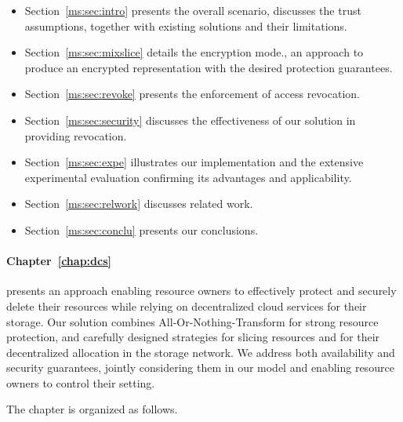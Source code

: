 \begin{itemize}
	\item Section~\ref{ms:sec:intro} presents the overall scenario, discusses the trust assumptions, together with existing solutions and their limitations.
	
	\item Section~\ref{ms:sec:mixslice} details the \name encryption mode., an approach to produce an encrypted representation with the desired protection guarantees.
	\item Section~\ref{ms:sec:revoke} presents the enforcement of access revocation. 
	
	\item Section~\ref{ms:sec:security} discusses the effectiveness of our solution in providing revocation.
	
	\item Section~\ref{ms:sec:expe} illustrates our implementation and the extensive experimental evaluation confirming its advantages and applicability. 
	
	\item Section~\ref{ms:sec:relwork} discusses related work. 
	
	\item Section~\ref{ms:sec:conclu} presents our conclusions.
\end{itemize}

\medskip

\paragraph*{Chapter~\ref{chap:dcs}}
presents an approach enabling resource owners to effectively protect and securely delete their resources while relying on decentralized cloud services for their storage.
Our solution combines All-Or-Nothing-Transform for strong resource protection, and carefully designed strategies for slicing resources and for their decentralized allocation in the storage network.  We address both availability and security guarantees, jointly considering them in our model and enabling resource owners to control their setting.

\smallskip

The chapter is organized as follows.

